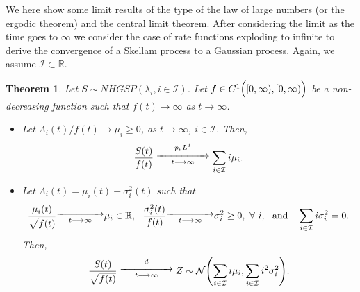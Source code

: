 \documentclass[12pt, twoside, english, headsepline]{article}
\newtheorem{theorem}{Theorem}[section] %
\theoremstyle{definition} %
\numberwithin{equation}{section} %
\begin{document}
We here show some limit results of the type of the law of large numbers (or the ergodic theorem) and the central limit theorem. After considering the limit as the time goes to $\infty$ we consider the case of rate functions exploding to infinite to derive the convergence of a Skellam process to a Gaussian process. Again, we assume $\mathcal{I}\subset \mathbb{R}$.

\begin{theorem}\label{teoremaConvergenzaSkellamGeneralizzato}
Let $S\sim NHGSP (\lambda_i,i\in\mathcal{I})$. Let $f\in C^1\Bigl([0,\infty), [0,\infty)\Bigr)$ be a non-decreasing function such that $f(t)\longrightarrow\infty$ as $t\longrightarrow\infty$. 
\begin{itemize}
\item[($i$)] Let $\Lambda_i(t) /f(t)\longrightarrow \mu_i\ge0$, as $t\longrightarrow \infty$, $ i\in\mathcal{I}$. Then,
\begin{equation}\label{convergenzaMediaLeggeGrandiNumeri}
\frac{S(t)}{f(t)}\stackrel{p,\, L^1}{ \substack{\xrightarrow{\hspace*{1.7cm}}\\t\longrightarrow \infty }} \sum_{i\in\mathcal{I}}i \mu_i.
\end{equation}

\item[($ii$)] Let $\Lambda_i(t) = \mu_i(t) +\sigma^2_i (t) $ such that 
\begin{equation}\label{ipotesiConvergenzaNormaleMuSigma}
\frac{\mu_i(t)}{\sqrt{f(t)}}\substack{\xrightarrow{\hspace*{1.5cm}}\\t\longrightarrow \infty }\mu_i\in\mathbb{R},\ \ \frac{\sigma^2_i(t)}{f(t)}\substack{\xrightarrow{\hspace*{1.5cm}}\\t\longrightarrow \infty }\sigma^2_i\ge0,\ \forall\ i, \ \text{ and }\ \ \sum_{i\in\mathcal{I}} i \sigma^2_i = 0.
\end{equation}
Then,
\begin{equation}
\frac{S(t)}{\sqrt{f(t)}}\stackrel{d}{ \substack{\xrightarrow{\hspace*{1.7cm}}\\t\longrightarrow \infty }}Z\sim\mathcal{N}\Biggl( \sum_{i\in\mathcal{I}}i \mu_i, \sum_{i\in\mathcal{I}} i^2 \sigma^2_i\Biggr).
\end{equation}
\end{itemize}
\end{theorem}
\end{document}
